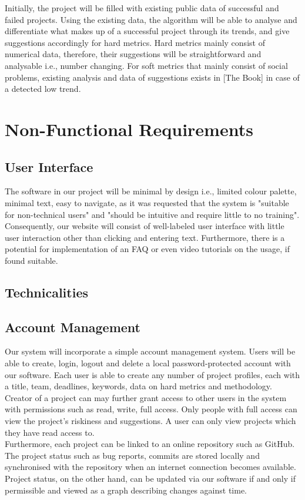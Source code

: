 \documentclass[a4paper]{article}
\theoremstyle{plain}
\theoremstyle{definition}
\theoremstyle{remark}
\begin{document}
\noindent Initially, the project will be filled with existing public data of successful and failed projects. Using the existing data, the algorithm will be able to analyse and differentiate what makes up of a successful project through its trends, and give suggestions accordingly for hard metrics. Hard metrics mainly consist of numerical data, therefore, their suggestions will be straightforward and analysable i.e., number changing. For soft metrics that mainly consist of social problems, existing analysis and data of suggestions exists in [The Book] in case of a detected low trend.
\section{Non-Functional Requirements}
\subsection{User Interface}
The software in our project will be minimal by design i.e., limited colour palette, minimal text, easy to navigate, as it was requested that the system is "suitable for non-technical users" and "should be intuitive and require little to no training". Consequently, our website will consist of well-labeled user interface with little user interaction other than clicking and entering text. Furthermore, there is a potential for implementation of an FAQ or even video tutorials on the usage, if found suitable. \\
\subsection{Technicalities}

\subsection{Account Management}
Our system will incorporate a simple account management system. Users will be able to create, login, logout and delete a local password-protected account with our software. Each user is able to create any number of project profiles, each with a title, team, deadlines, keywords, data on hard metrics and methodology. Creator of a project can may further grant access to other users in the system with permissions such as read, write, full access. Only people with full access can view the project's riskiness and suggestions. A user can only view projects which they have read access to. \\

\noindent Furthermore, each project can be linked to an online repository such as GitHub. The project status such as bug reports, commits are stored locally and synchronised with the repository  when an internet connection becomes available. Project status, on the other hand, can be updated via our software if and only if permissible and viewed as a graph describing changes against time. 
\end{document}
